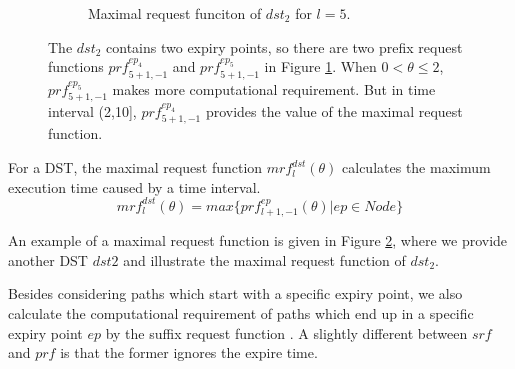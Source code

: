 \documentclass[sigconf]{acmart}
\begin{document}
\begin{figure}
\begin{subfigure}[t]{3.25in}
    \caption{Maximal request funciton of $dst_2$ for $l=5$.}\label{figure_mrf}
  \end{subfigure}
  \caption{The $dst_2$ contains two expiry points, so there are two prefix request functions $prf^{ep_4}_{5+1,-1}$ and $prf^{ep_5}_{5+1,-1}$ in Figure \ref{figure_mrf}. When $0<\theta\leq2$, $prf^{ep_5}_{5+1,-1}$ makes more computational requirement. But in time interval (2,10], $prf^{ep_4}_{5+1,-1}$ provides the value of the maximal request function.}\label{figure_dst2_mrf}
\end{figure}
\begin{definition}
For a DST, the maximal request function $mrf^{dst}_l(\theta)$ calculates the maximum execution time caused by a time interval.%
\begin{equation}
mrf^{dst}_l(\theta)=max\{prf^{ep}_{l+1,-1}(\theta)|ep\in Node\}
\end{equation}\label{equation_mrf}
\end{definition}

An example of a maximal request function is given in Figure \ref{figure_dst2_mrf}, where we provide another DST $dst2$ and illustrate the maximal request function of $dst_2$.

Besides considering paths which start with a specific expiry point, we also calculate the computational requirement of paths which end up in a specific expiry point $ep$ by the suffix request function \cite{DBLP:journals/rts/Stigge015a}. A slightly different between $srf$ and $prf$ is that the former ignores the expire time.%
\end{document}

